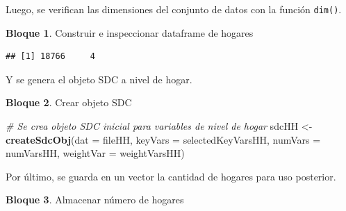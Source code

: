 \documentclass[]{book}
\newenvironment{Shaded}{\begin{snugshade}}{\end{snugshade}}
\newcommand{\CommentTok}[1]{\textcolor[rgb]{0.56,0.35,0.01}{\textit{#1}}}
\newcommand{\DataTypeTok}[1]{\textcolor[rgb]{0.13,0.29,0.53}{#1}}
\newcommand{\KeywordTok}[1]{\textcolor[rgb]{0.13,0.29,0.53}{\textbf{#1}}}
\newcommand{\NormalTok}[1]{#1}
\newcommand{\OperatorTok}[1]{\textcolor[rgb]{0.81,0.36,0.00}{\textbf{#1}}}
\newcommand{\StringTok}[1]{\textcolor[rgb]{0.31,0.60,0.02}{#1}}
\theoremstyle{definition}
\theoremstyle{definition}
\newtheorem{example}{Bloque}[chapter]
\theoremstyle{definition}
\theoremstyle{definition}
\theoremstyle{remark}
\begin{document}
Luego, se verifican las dimensiones del conjunto de datos con la función \texttt{dim()}.

\begin{example}
\protect\hypertarget{exm:bloque42nbm}{}{\label{exm:bloque42nbm} }Construir e inspeccionar dataframe de hogares
\end{example}

\begin{Shaded}
\end{Shaded}

\begin{verbatim}
## [1] 18766     4
\end{verbatim}

Y se genera el objeto SDC a nivel de hogar.

\begin{example}
\protect\hypertarget{exm:bloque43nbm}{}{\label{exm:bloque43nbm} }Crear objeto SDC
\end{example}

\begin{Shaded}
\begin{Highlighting}[]
\CommentTok{# Se crea objeto SDC inicial para variables de nivel de hogar}
\NormalTok{sdcHH <-}\StringTok{ }\KeywordTok{createSdcObj}\NormalTok{(}\DataTypeTok{dat =}\NormalTok{ fileHH, }\DataTypeTok{keyVars =}\NormalTok{ selectedKeyVarsHH,}
                      \DataTypeTok{numVars =}\NormalTok{ numVarsHH, }\DataTypeTok{weightVar =}\NormalTok{ weightVarsHH)}
\end{Highlighting}
\end{Shaded}

Por último, se guarda en un vector la cantidad de hogares para uso posterior.

\begin{example}
\protect\hypertarget{exm:bloque44nbm}{}{\label{exm:bloque44nbm} }Almacenar número de hogares
\end{example}
\end{document}
